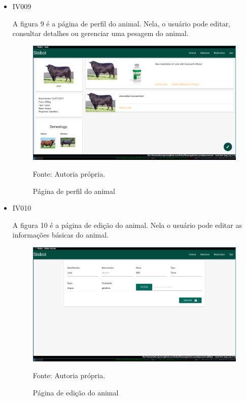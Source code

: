 \begin{itemize}
\newpage
\item IV009

A figura 9 é a página de perfil do animal. Nela, o usuário pode editar, consultar detalhes ou gerenciar uma pesagem do animal.
\begin{figure}[H]
	\begin{center}
		\caption{Página de perfil do animal}
		\includegraphics[width=13cm]{../img/prototipos/perfil.png}

		Fonte: Autoria própria.
	\end{center}
\end{figure}


\item IV010

A figura 10 é a página de edição do animal. Nela o usuário pode editar as informações básicas do animal.
\begin{figure}[]
	\begin{center}
		\caption{Página de edição do animal}
		\includegraphics[width=13cm]{../img/prototipos/editar.png}

		Fonte: Autoria própria.
	\end{center}
\end{figure}


\end{itemize}
